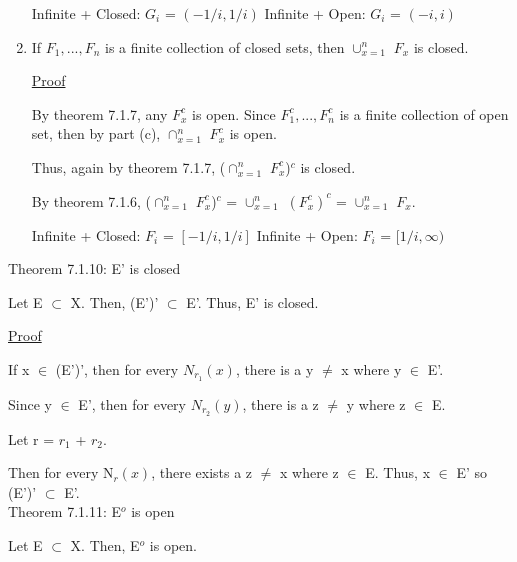\begin{enumerate}[label=(\alph*), leftmargin=2cm, itemsep=0.4em]
				{\color{purple} Infinite + Closed}: $G_i$ = $(-1/i,1/i)$
				\hfill
				{\color{purple} Infinite + Open}: $G_i$ = $(-i,i)$

		\item If $F_1, ... , F_n$ is a finite collection of closed sets,
		then $\cup_{x=1}^n$ $F_x$ is closed.

			{ \color{magenta} \underline{Proof} }

				By {\color{red} theorem 7.1.7}, any $F_x^c$ is open.
				Since $F_1^c, ... , F_n^c$ is a finite collection of
				open set, then by part (c), $\cap_{x=1}^n$ $F_x^c$ is open.

				Thus, again by {\color{red} theorem 7.1.7},
				($\cap_{x=1}^n$ $F_x^c$)$^c$ is closed.

				By {\color{red} theorem 7.1.6},
				($\cap_{x=1}^n$ $F_x^c$)$^c$ = $\cup_{x=1}^n$ $(F_x^c)^c$
				= $\cup_{x=1}^n$ $F_x$.

				\vspace{0.1cm}

				{\color{purple} Infinite + Closed}: $F_i$ = $[-1/i,1/i]$
				\hfill
				{\color{purple} Infinite + Open}: $F_i$ = $[1/i,\infty)$
	\end{enumerate}

\newpage

{ \color{red} Theorem 7.1.10: E' is closed }

	\begin{adjustbox}{minipage=14cm, right, vspace=0.1cm 0cm}
		Let  E $\subset$ X. Then, (E')' $\subset$ E'.
		Thus, E' is closed.
	\end{adjustbox}

{ \color{magenta} \underline{Proof} }

	If x $\in$ (E')', then for every $N_{r_1}(x)$, there is a
	y $\not =$ x where y $\in$ E'.
	
	Since y $\in$ E', then for every $N_{r_2}(y)$, there is a
	z $\not =$ y where z $\in$ E.

	Let r = $r_1$ + $r_2$.

	Then for every N$_r(x)$, there exists a z $\not =$ x where
	z $\in$ E.
	Thus, x $\in$ E' so (E')' $\subset$ E'. \\

{ \color{red} Theorem 7.1.11: E$^o$ is open }

	\begin{adjustbox}{minipage=14cm, right, vspace=0.1cm 0cm}
		Let  E $\subset$ X. Then, E$^o$ is open.
	\end{adjustbox}

